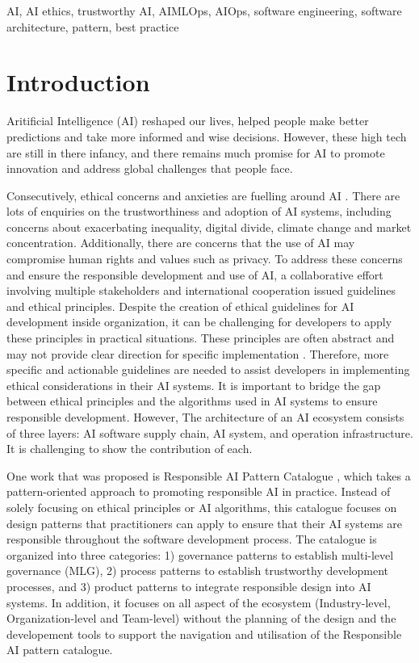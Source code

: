 \documentclass[conference]{IEEEtran}
\begin{document}
\begin{IEEEkeywords}
AI, AI ethics, trustworthy AI, AIMLOps, AIOps, software engineering, software architecture, pattern, best practice
\end{IEEEkeywords}

\section{Introduction}
Aritificial Intelligence (AI) reshaped our lives, helped people make better predictions and take more informed and wise decisions. However, these high tech are still in there infancy, and there remains much promise for AI to promote innovation and address global challenges that people face.

Consecutively, ethical concerns and anxieties are fuelling around AI \cite{DBLP}. There are lots of enquiries on the trustworthiness and adoption of AI systems, including concerns about exacerbating inequality, digital divide, climate change and market concentration. Additionally, there are concerns that the use of AI may compromise human rights and values such as privacy. To address these concerns and ensure the responsible development and use of AI, a collaborative effort involving multiple stakeholders and international cooperation issued guidelines and ethical principles. Despite the creation of ethical guidelines for AI development inside organization, it can be challenging for developers to apply these principles in practical situations. These principles are often abstract and may not provide clear direction for specific implementation \cite{abs-2111-09478}. Therefore, more specific and actionable guidelines are needed to assist developers in implementing ethical considerations in their AI systems. It is important to bridge the gap between ethical principles and the algorithms used in AI systems to ensure responsible development. However, The architecture of an AI ecosystem consists of three layers: AI software supply chain, AI system, and operation infrastructure. It is challenging to show the contribution of each.

One work that was proposed is Responsible AI Pattern Catalogue \cite{catalogue}, which takes a pattern-oriented approach to promoting responsible AI in practice. Instead of solely focusing on ethical principles or AI algorithms, this catalogue focuses on design patterns that practitioners can apply to ensure that their AI systems are responsible throughout the software development process. The catalogue is organized into three categories: 1) governance patterns to establish multi-level governance (MLG), 2) process patterns to establish trustworthy development processes, and 3) product patterns to integrate responsible design into AI systems. In addition, it focuses on all aspect of the ecosystem (Industry-level, Organization-level and Team-level) without the planning of the design and the developement tools to support the navigation and utilisation of the Responsible AI pattern catalogue.
\end{document}
